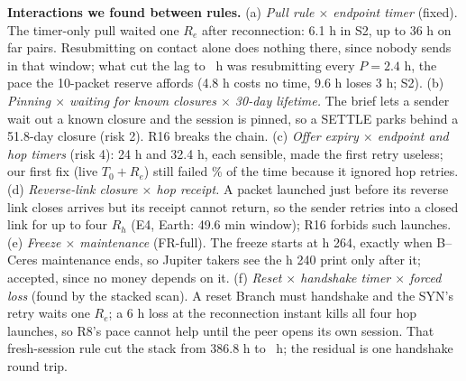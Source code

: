 \textbf{Interactions we found between rules.}
(a) \emph{Pull rule $\times$ endpoint timer} (fixed). The timer-only pull waited one $R_e$ after reconnection: 6.1 h in S2, up to 36 h on far pairs. Resubmitting on contact alone does nothing there, since nobody sends in that window; what cut the lag to \SimSTwoFRSpendableAfter\ h was resubmitting every $P = 2.4$ h, the pace the 10-packet reserve affords (4.8 h costs no time, 9.6 h loses 3 h; S2).
(b) \emph{Pinning $\times$ waiting for known closures $\times$ 30-day lifetime.} The brief lets a sender wait out a known closure and the session is pinned, so a SETTLE parks behind a 51.8-day closure (risk 2). R16 breaks the chain.
(c) \emph{Offer expiry $\times$ endpoint and hop timers} (risk 4): 24 h and 32.4 h, each sensible, made the first retry useless; our first fix (live $T_0 + R_e$) still failed \EtwoVMEarthDeclineFortyEight\% of the time because it ignored hop retries.
(d) \emph{Reverse-link closure $\times$ hop receipt.} A packet launched just before its reverse link closes arrives but its receipt cannot return, so the sender retries into a closed link for up to four $R_h$ (E4, Earth: 49.6 min window); R16 forbids such launches.
(e) \emph{Freeze $\times$ maintenance} (FR-full). The freeze starts at h 264, exactly when B--Ceres maintenance ends, so Jupiter takers see the h 240 print only after it; accepted, since no money depends on it.
(f) \emph{Reset $\times$ handshake timer $\times$ forced loss} (found by the stacked scan). A reset Branch must handshake and the SYN's retry waits one $R_e$; a 6 h loss at the reconnection instant kills all four hop launches, so R8's pace cannot help until the peer opens its own session. That fresh-session rule cut the stack from 386.8 h to \SimStackSpendable\ h; the residual is one handshake round trip.
